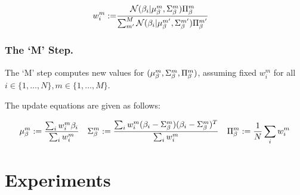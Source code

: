 \begin{align}
    w_{i}^{m} 
    :=& 
    \frac{
        \mathcal{N}(\beta_{i} | \mu_{\beta}^{m},\Sigma_{\beta}^{m})\Pi_{\beta}^{m}
    }
    {
        \sum_{m'}^{M}
        \mathcal{N}(\beta_{i} | \mu_{\beta}^{m'},\Sigma_{\beta}^{m'})\Pi_{\beta}^{m'}
    }
\end{align}



\subsubsection{The `M' Step.}
The `M' step computes new values for $(\mu_{\beta}^{m}, \Sigma_{\beta}^{m}, \Pi_{\beta}^{m})$, assuming fixed $w_{i}^{m}$ for all $i \in \{1,\dots,N\}, m \in \{1,\dots,M\}$.

The update equations are given as follows:



\begin{equation}
    \mu_{\beta}^{m} := 
    \frac{
        \sum_{i}w_{i}^{m}\beta_{i}
    }
    {
        \sum_{i}w_{i}^{m}
    }
    \quad
    \Sigma_{\beta}^{m} :=
    \frac{
        \sum_{i}w_{i}^{m}
        (\beta_{i} - \Sigma_{\beta}^{m})
        (\beta_{i} - \Sigma_{\beta}^{m})^{T}
    }
    {
        \sum_{i}w_{i}^{m}
    }
    \quad
    \Pi_{\beta}^{m} :=
    \frac{1}{N}\sum_{i}{w_{i}^{m}}
\end{equation}

\section{Experiments}

